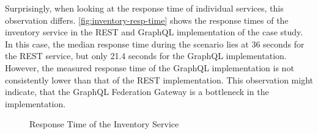 Surprisingly, when looking at the response time of individual services, this observation differs.
\autoref{fig:inventory-resp-time} shows the response times of the inventory service in the \ac{REST} and GraphQL implementation of the case study.
In this case, the median response time during the scenario lies at 36 seconds for the \ac{REST} service, but only 21.4 seconds for the GraphQL implementation.
However, the measured response time of the GraphQL implementation is not consistently lower than that of the \ac{REST} implementation.
This observation might indicate, that the GraphQL Federation Gateway is a bottleneck in the implementation.

\begin{figure}[b!]
    \centering
    \caption{Response Time of the Inventory Service}\label{fig:inventory-resp-time}    
\end{figure}

